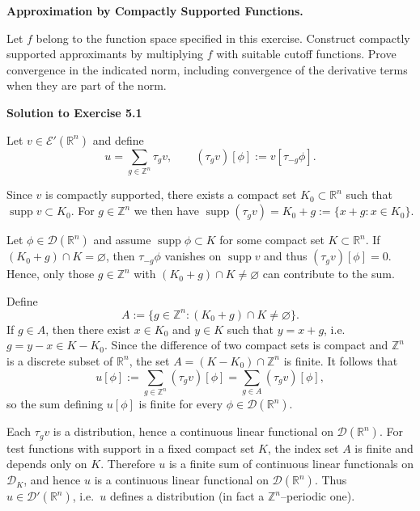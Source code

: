 \begin{problem}[CP-II-0320]
\label{prob:cp-ii-0320}
\textbf{Approximation by Compactly Supported Functions.}

\hspace*{1.5em}Let \(f\) belong to the function space specified in this exercise. Construct
compactly supported approximants by multiplying \(f\) with suitable cutoff
functions. Prove convergence in the indicated norm, including convergence of
the derivative terms when they are part of the norm.
\end{problem}

\begin{solution}

\par\medskip\noindent\textbf{Solution to Exercise 5.1}\par\smallskip


Let $v\in\mathcal{E}'(\mathbb{R}^n)$ and define
\[
u = \sum_{g\in\mathbb{Z}^n} \tau_g v,
\qquad
(\tau_g v)[\phi] := v[\tau_{-g}\phi].
\]

Since $v$ is compactly supported, there exists a compact set
$K_0\subset\mathbb{R}^n$ such that
$\operatorname{supp}v\subset K_0$.  For $g\in\mathbb{Z}^n$ we then have
$\operatorname{supp}(\tau_g v) = K_0+g := \{x+g : x\in K_0\}$.

Let $\phi\in\mathcal{D}(\mathbb{R}^n)$ and assume
$\operatorname{supp}\phi\subset K$ for some compact set
$K\subset\mathbb{R}^n$.  If $(K_0+g)\cap K=\varnothing$, then
$\tau_{-g}\phi$ vanishes on $\operatorname{supp}v$ and thus
$(\tau_g v)[\phi]=0$.  Hence, only those $g\in\mathbb{Z}^n$ with
$(K_0+g)\cap K\neq\varnothing$ can contribute to the sum.

Define
\[
A := \{g\in\mathbb{Z}^n : (K_0+g)\cap K\neq\varnothing\}.
\]
If $g\in A$, then there exist $x\in K_0$ and $y\in K$ such that
$y=x+g$, i.e.\ $g=y-x\in K-K_0$.  Since the difference of two compact
sets is compact and $\mathbb{Z}^n$ is a discrete subset of
$\mathbb{R}^n$, the set $A = (K-K_0)\cap\mathbb{Z}^n$ is finite.  It
follows that
\[
u[\phi] := \sum_{g\in\mathbb{Z}^n} (\tau_g v)[\phi]
= \sum_{g\in A} (\tau_g v)[\phi],
\]
so the sum defining $u[\phi]$ is finite for every
$\phi\in\mathcal{D}(\mathbb{R}^n)$.

Each $\tau_g v$ is a distribution, hence a continuous linear functional
on $\mathcal{D}(\mathbb{R}^n)$.  For test functions with support in a
fixed compact set $K$, the index set $A$ is finite and depends only on
$K$.  Therefore $u$ is a finite sum of continuous linear functionals on
$\mathcal{D}_K$, and hence $u$ is a continuous linear functional on
$\mathcal{D}(\mathbb{R}^n)$.  Thus $u\in\mathcal{D}'(\mathbb{R}^n)$,
i.e.\ $u$ defines a distribution (in fact a $\mathbb{Z}^n$--periodic
one).

\bigskip
\end{solution}

